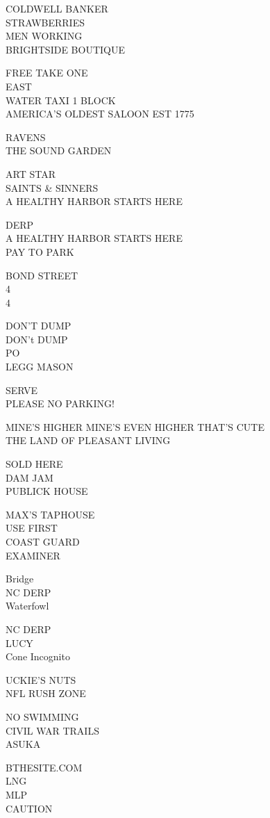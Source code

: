 \documentclass[10pt,letterpaper]{article}
\begin{document}
COLDWELL BANKER\\
STRAWBERRIES\\
MEN WORKING\\
BRIGHTSIDE BOUTIQUE

FREE TAKE ONE\\
EAST\\
WATER TAXI 1 BLOCK\\
AMERICA'S OLDEST SALOON EST 1775

RAVENS\\
THE SOUND GARDEN

ART STAR\\
SAINTS \& SINNERS\\
A HEALTHY HARBOR STARTS HERE

DERP\\
A HEALTHY HARBOR STARTS HERE\\
PAY TO PARK

BOND STREET\\
4\\
4

DON'T DUMP\\
DON't DUMP\\
PO\\
LEGG MASON

SERVE\\
PLEASE NO PARKING!

MINE'S HIGHER MINE'S EVEN HIGHER THAT'S CUTE\\
THE LAND OF PLEASANT LIVING

SOLD HERE\\
DAM JAM\\
PUBLICK HOUSE

MAX'S TAPHOUSE\\
USE FIRST\\
COAST GUARD\\
EXAMINER

Bridge\\
NC DERP\\
Waterfowl

NC DERP\\
LUCY\\
Cone Incognito

UCKIE'S NUTS\\
NFL RUSH ZONE

NO SWIMMING\\
CIVIL WAR TRAILS\\
ASUKA

BTHESITE.COM\\
LNG\\
MLP\\
CAUTION
\end{document}
